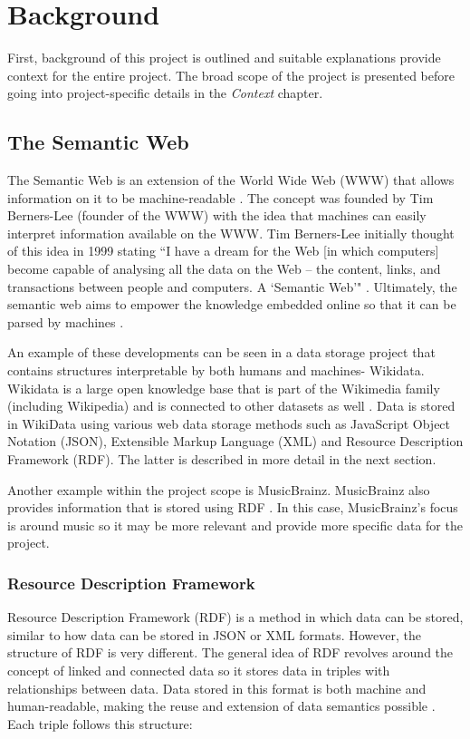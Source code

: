 \usetikzlibrary {arrows}
\usetikzlibrary {shapes.geometric}
\usetikzlibrary {patterns}

\chapter{Background}
First, background of this project is outlined and suitable explanations provide context for the entire project. The broad scope of the project is presented before going into project-specific details in the \textit{Context} chapter.

\section{The Semantic Web}
\hspace*{0.5cm} The Semantic Web is an extension of the World Wide Web (WWW) that allows information on it to be machine-readable \cite{semanticweb}. The concept was founded by Tim Berners-Lee (founder of the WWW) with the idea that machines can easily interpret information available on the WWW. Tim Berners-Lee initially thought of this idea in 1999 stating ``I have a dream for the Web [in which computers] become capable of analysing all the data on the Web – the content, links, and transactions between people and computers. A `Semantic Web'" \cite{berners-TBLBook}. Ultimately, the semantic web aims to empower the knowledge embedded online so that it can be parsed by machines \cite{semanticweb}. 

An example of these developments can be seen in a data storage project that contains structures interpretable by both humans and machines- Wikidata. Wikidata is a large open knowledge base that is part of the Wikimedia family (including Wikipedia) and is connected to other datasets as well \cite{wikidata}. Data is stored in WikiData using various web data storage methods such as JavaScript Object Notation (JSON), Extensible Markup Language (XML) and Resource Description Framework (RDF). The latter is described in more detail in the next section.  

Another example within the project scope is MusicBrainz. MusicBrainz also provides information that is stored using RDF \cite{musicbrainz}. In this case, MusicBrainz's focus is around music so it may be more relevant and provide more specific data for the project. 

\subsection{Resource Description Framework}
\hspace*{0.5cm} Resource Description Framework (RDF) is a method in which data can be stored, similar to how data can be stored in JSON or XML formats. However, the structure of RDF is very different. The general idea of RDF revolves around the concept of linked and connected data so it stores data in triples with relationships between data. Data stored in this format is both machine and human-readable, making the reuse and extension of data semantics possible \cite{rdf}. Each triple follows this structure: 

